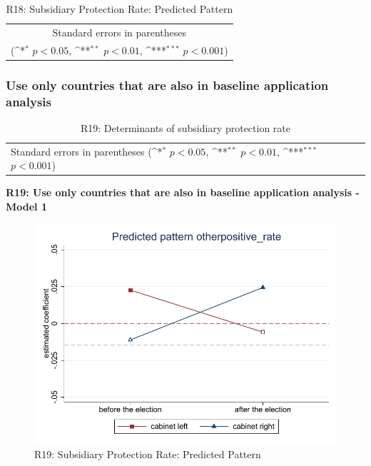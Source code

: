 \documentclass[10pt,a4paper]{scrartcl}
\begin{document}
\begin{table}[!ht]\centering
	\footnotesize
	\renewcommand{\arraystretch}{1.2}
	\def\sym#1{\ifmmode^{#1}\else\(^{#1}\)\fi}
	\caption{R18: Subsidiary Protection Rate: Predicted Pattern}
	\begin{tabular}{l*{2}{c}}
		\hline\hline
		
		\hline\hline
		\multicolumn{3}{c}{\footnotesize Standard errors in parentheses} \\
		\multicolumn{3}{c}{\footnotesize (\sym{*} \(p<0.05\), \sym{**} \(p<0.01\), \sym{***} \(p<0.001\))} \\
	\end{tabular}
\end{table}





\clearpage
\FloatBarrier
\subsubsection{Use only countries that are also in baseline application analysis}
\begin{table}[!ht]\centering
	\renewcommand{\arraystretch}{1.25}
	\small
	\def\sym#1{\ifmmode^{#1}\else\(^{#1}\)\fi}
	\caption{R19: Determinants of subsidiary protection rate}
	\begin{tabular}{l*{3}{c}}
		\hline\hline
		
		\hline\hline
		\multicolumn{4}{l}{\footnotesize Standard errors in parentheses (\sym{*} \(p<0.05\), \sym{**} \(p<0.01\), \sym{***} \(p<0.001\))}\\
	\end{tabular}
\end{table}

\clearpage
\textbf{R19: Use only countries that are also in baseline application analysis - Model 1}
\begin{figure}[!ht]
	\centering
	\includegraphics[width=1\textwidth]{figures_edited/otherpositive_rate_graph1_R19.pdf}
	\caption{R19: Subsidiary Protection Rate: Predicted Pattern}
\end{figure}
\end{document}
